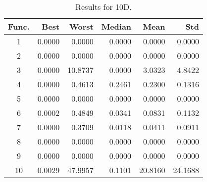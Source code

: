 \begin{table}[ht]
\centering
\caption{ Results for 10D. }
\label{tab:10D}
\begin{tabular}{crrrrr}
\hline
{Func.} & Best & Worst & Median & Mean & Std \\
\hline
1 & 0.0000 & 0.0000 & 0.0000 & 0.0000 & 0.0000 \\
2 & 0.0000 & 0.0000 & 0.0000 & 0.0000 & 0.0000 \\
3 & 0.0000 & 10.8737 & 0.0000 & 3.0323 & 4.8422 \\
4 & 0.0000 & 0.4613 & 0.2461 & 0.2300 & 0.1316 \\
5 & 0.0000 & 0.0000 & 0.0000 & 0.0000 & 0.0000 \\
6 & 0.0002 & 0.4849 & 0.0341 & 0.0831 & 0.1132 \\
7 & 0.0000 & 0.3709 & 0.0118 & 0.0411 & 0.0911 \\
8 & 0.0000 & 0.0000 & 0.0000 & 0.0000 & 0.0000 \\
9 & 0.0000 & 0.0000 & 0.0000 & 0.0000 & 0.0000 \\
10 & 0.0029 & 47.9957 & 0.1101 & 20.8160 & 24.1688 \\
\hline
\end{tabular}
\end{table}
